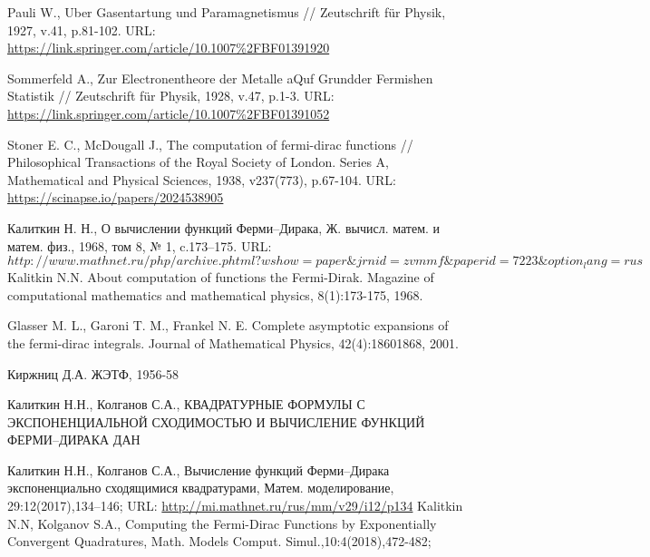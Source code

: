 
\begin{thebibliography}{99}
 Pauli W., Uber Gasentartung und Paramagnetismus // Zeutschrift für Physik,
1927, v.41, p.81-102. URL: \href{https://link.springer.com/article/10.1007\%2FBF01391920}{https://link.springer.com/article/10.1007\%2FBF01391920}

 Sommerfeld A., Zur Electronentheore der Metalle aQuf Grundder Fermishen
Statistik // Zeutschrift für Physik, 1928, v.47, p.1-3. URL: \href{https://link.springer.com/article/10.1007\%2FBF01391052}{https://link.springer.com/article/10.1007\%2FBF01391052}

 Stoner E. C., McDougall J., The computation of fermi-dirac functions //
Philosophical Transactions of the Royal Society of London. Series A, Mathematical and Physical Sciences, 1938, v237(773), p.67-104. URL: \href{https://scinapse.io/papers/2024538905}{https://scinapse.io/papers/2024538905}

 Калиткин Н. Н., О вычислении функций Ферми–Дирака, Ж. вычисл. матем. и матем. физ., 1968, том 8, № 1, c.173–175. URL: \href{http://www.mathnet.ru/php/archive.phtml?wshow=paper&jrnid=zvmmf&paperid=7223&option_lang=rus}{$http://www.mathnet.ru/php/archive.phtml?wshow=paper\&jrnid=zvmmf\&paperid=7223\&option_lang=rus$}
Kalitkin N.N. About computation of functions the Fermi-Dirak. Magazine of computational mathematics and mathematical physics, 8(1):173-175, 1968.

 Glasser M. L., Garoni T. M., Frankel N. E. Complete asymptotic expansions of the fermi-dirac integrals. Journal of Mathematical Physics, 42(4):18601868, 2001.

 Киржниц Д.А. ЖЭТФ, 1956-58

 Калиткин Н.Н., Колганов С.А., КВАДРАТУРНЫЕ ФОРМУЛЫ С ЭКСПОНЕНЦИАЛЬНОЙ СХОДИМОСТЬЮ И ВЫЧИСЛЕНИЕ ФУНКЦИЙ ФЕРМИ–ДИРАКА ДАН 

 Калиткин Н.Н., Колганов С.А., Вычисление функций Ферми–Дирака экспоненциально сходящимися квадратурами, Матем. моделирование, 29:12(2017),134–146; URL: \href{http://mi.mathnet.ru/rus/mm/v29/i12/p134}{http://mi.mathnet.ru/rus/mm/v29/i12/p134}
Kalitkin N.N, Kolganov S.A., Computing the Fermi-Dirac Functions by Exponentially Convergent Quadratures, Math. Models Comput. Simul.,10:4(2018),472-482;


\end{thebibliography}
